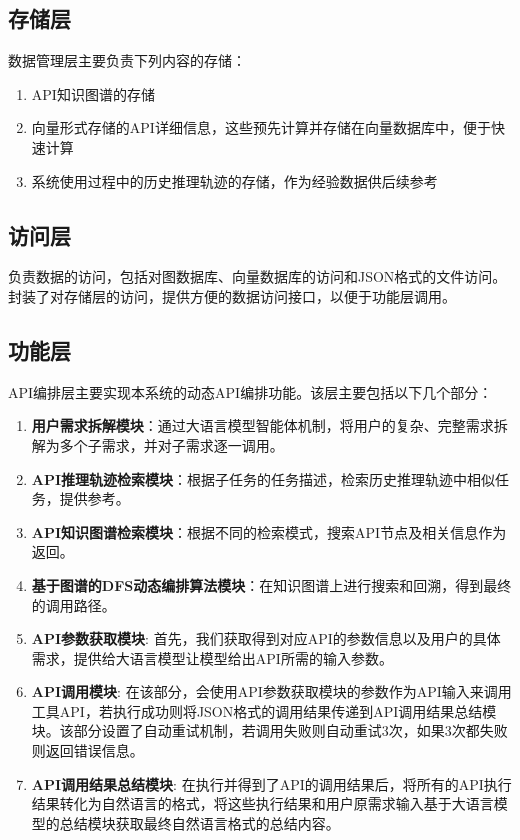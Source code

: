 \subsection{存储层}
数据管理层主要负责下列内容的存储：
\begin{enumerate}
    \item API知识图谱的存储
    \item 向量形式存储的API详细信息，这些预先计算并存储在向量数据库中，便于快速计算
    \item 系统使用过程中的历史推理轨迹的存储，作为经验数据供后续参考
\end{enumerate}

\subsection{访问层}

负责数据的访问，包括对图数据库、向量数据库的访问和JSON格式的文件访问。封装了对存储层的访问，提供方便的数据访问接口，以便于功能层调用。

\subsection{功能层}
API编排层主要实现本系统的动态API编排功能。该层主要包括以下几个部分：
\begin{enumerate}
    \item \textbf{用户需求拆解模块}：通过大语言模型智能体机制，将用户的复杂、完整需求拆解为多个子需求，并对子需求逐一调用。
    \item \textbf{API推理轨迹检索模块}：根据子任务的任务描述，检索历史推理轨迹中相似任务，提供参考。
    \item \textbf{API知识图谱检索模块}：根据不同的检索模式，搜索API节点及相关信息作为返回。
    \item \textbf{基于图谱的DFS动态编排算法模块}：在知识图谱上进行搜索和回溯，得到最终的调用路径。
    \item \textbf{API参数获取模块}: 首先，我们获取得到对应API的参数信息以及用户的具体需求，提供给大语言模型让模型给出API所需的输入参数。
    \item \textbf{API调用模块}: 在该部分，会使用API参数获取模块的参数作为API输入来调用工具API，若执行成功则将JSON格式的调用结果传递到API调用结果总结模块。该部分设置了自动重试机制，若调用失败则自动重试3次，如果3次都失败则返回错误信息。
    \item \textbf{API调用结果总结模块}: 在执行并得到了API的调用结果后，将所有的API执行结果转化为自然语言的格式，将这些执行结果和用户原需求输入基于大语言模型的总结模块获取最终自然语言格式的总结内容。
\end{enumerate}

